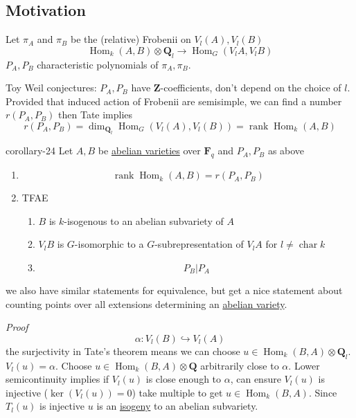 \documentclass[10pt,]{book}
\makeatletter
\renewcommand*{\proofname}{Proof}
\renewenvironment{proof}[1][\proofname]{\par
  \pushQED{\qed}%
  \normalfont \topsep6\p@\@plus6\p@\relax
  \trivlist
  \item\relax
    {\itshape
    #1\@addpunct{.}}\hspace\labelsep\ignorespaces
}{%
  \popQED\endtrivlist\@endpefalse
}
\numberwithin{equation}{section}
\newcommand{\ZZ}{\mathbf{Z}}
\newcommand{\QQ}{\mathbf{Q}}
\newcommand{\FF}{\mathbf{F}}
\DeclareMathOperator{\Hom}{Hom}
\DeclareMathOperator{\rank}{rank}
\DeclareMathOperator{\characteristic}{char}
\makeatother
\begin{document}
\subsection[{Motivation}]{Motivation}\label{subsection-31}
\hypertarget{p-378}{}%
Let \(\pi_A\) and \(\pi_B\) be the (relative) Frobenii on \(V_l(A), V_l(B)\)%
\begin{equation*}
\Hom_{k}(A,B)\otimes \QQ_l \to \Hom_G(V_l A, V_lB)
\end{equation*}
\(P_A,P_B\) characteristic polynomials of \(\pi_A,\pi_B\).%
\par
\hypertarget{p-379}{}%
Toy Weil conjectures: \(P_A, P_B\) have \(\ZZ\)-coefficients, don't depend on the choice of \(l\). Provided that induced action of Frobenii are semisimple, we can find a number \(r(P_A,P_B)\) then Tate implies%
\begin{equation*}
r(P_A,P_B) = \dim_{\QQ_l} \Hom_G (V_l(A), V_l(B)) = \rank \Hom_k(A,B)
\end{equation*}
%
\begin{corollary}{}{}{corollary-24}%
\hypertarget{p-380}{}%
Let \(A, B\) be \hyperref[def-buntes-abvar]{abelian varieties} over \(\FF_q\) and \(P_A, P_B\) as above\leavevmode%
\begin{enumerate}
\item\hypertarget{li-66}{}%
\begin{equation*}
\rank \Hom_k(A,B) = r(P_A,P_B)
\end{equation*}
%
\item\hypertarget{li-67}{}\hypertarget{p-381}{}%
TFAE%
\begin{enumerate}
\item\hypertarget{li-68}{}\(B\) is \(k\)-isogenous to an abelian subvariety of \(A\)%
\item\hypertarget{li-69}{}\(V_lB\) is \(G\)-isomorphic to a \(G\)-subrepresentation of \(V_lA\) for \(l \ne \characteristic k\)%
\item\hypertarget{li-70}{}%
\begin{equation*}
P_B | P_A
\end{equation*}
%
\end{enumerate}
%
\end{enumerate}
we also have similar statements for equivalence, but get a nice statement about counting points over all extensions determining an \hyperref[def-buntes-abvar]{abelian variety}.%
\end{corollary}
\begin{proof}\hypertarget{proof-64}{}
\hypertarget{p-382}{}%
%
\begin{equation*}
\alpha \colon V_l(B)\hookrightarrow V_l(A)
\end{equation*}
the surjectivity in Tate's theorem means we can choose \(u \in \Hom_k(B,A) \otimes \QQ_l\). \(V_l(u) = \alpha\). Choose \(u \in \Hom_k(B,A) \otimes \QQ\) arbitrarily close to \(\alpha\). Lower semicontinuity implies if \(V_l(u)\) is close enough to \(\alpha\), can ensure \(V_l(u)\) is injective (\(\ker (V_l (u)) = 0\)) take multiple to get \(u \in \Hom_k(B,A)\). Since \(T_l (u)\) is injective \(u \) is an \hyperref[def-supersing-isog-isog]{isogeny} to an abelian subvariety.%
\end{proof}
\end{document}
